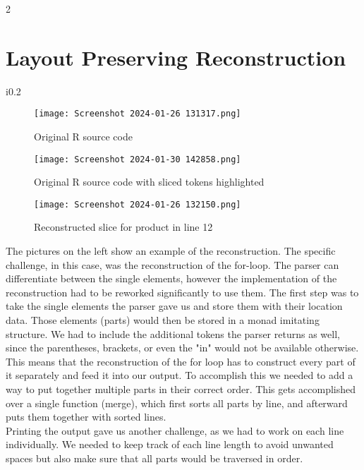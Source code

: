 \documentclass[a3paper, portrait, english, default]{uulm-cs-poster}
\begin{document}
\begin{multicols}{2}
\section*{Layout Preserving Reconstruction}
	\begin{wrapfigure}{i}{0.2\textwidth}
		\begin{subfigure}[b]{0.2\textwidth}
			\texttt{[image: Screenshot 2024-01-26 131317.png]}
			\caption{Original R source code}
			\label{Fig.1}
		\end{subfigure}
		\begin{subfigure}[b]{0.2\textwidth}
			\texttt{[image: Screenshot 2024-01-30 142858.png]}
			\caption{Original R source code with sliced tokens highlighted}
			\label{Fig.2}
		\end{subfigure}
		\begin{subfigure}[b]{0.2\textwidth}
			\texttt{[image: Screenshot 2024-01-26 132150.png]}
			\caption{Reconstructed slice for product in line 12}
			\label{Fig.3}
		\end{subfigure}
	\end{wrapfigure}
The pictures on the left show an example of the reconstruction. The specific challenge, in this case, was the reconstruction of the for-loop. The parser can differentiate between the single elements, however the implementation of the reconstruction had to be reworked significantly to use them.
The first step was to take the single elements the parser gave us and store them with their location data. Those elements (parts) would then be stored in a monad imitating structure. We had to include the additional tokens the parser returns as well, since the parentheses, brackets, or even the "in" would not be available otherwise. This means that the reconstruction of the for loop has to construct every part of it separately and feed it into our output. To accomplish this we needed to add a way to put together multiple parts in their correct order. This gets accomplished over a single function (merge), which first sorts all parts by line, and afterward puts them together with sorted lines. \\ Printing the output gave us another challenge, as we had to work on each line individually. We needed to keep track of each line length to avoid unwanted spaces but also make sure that all parts would be traversed in order. 
\end{multicols}
\end{document}
